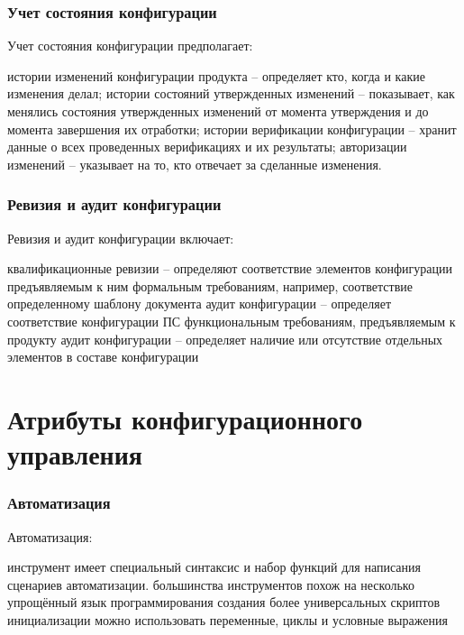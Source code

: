 \documentclass{../industrial-development}
\begin{document}
\lecturenotes

\begin{frame} \frametitle{Учет состояния конфигурации}
  \begin{block}{Учет состояния конфигурации предполагает:}
  \begin{itemize}
 истории изменений конфигурации продукта – определяет кто, когда и какие изменения делал;
 истории состояний утвержденных изменений – показывает, как менялись состояния утвержденных изменений от момента утверждения и до момента завершения их отработки;
 истории верификации конфигурации – хранит данные о всех проведенных верификациях и их результаты;
 авторизации изменений – указывает на то, кто отвечает за сделанные изменения.
  \end{itemize}
	\end{block}
\end{frame}

\lecturenotes

\begin{frame} \frametitle{Ревизия и аудит конфигурации}
  \begin{block}{Ревизия и аудит конфигурации включает:}
  \begin{itemize}
 квалификационные ревизии – определяют соответствие элементов конфигурации предъявляемым к ним формальным требованиям, например, соответствие определенному шаблону документа
 аудит конфигурации – определяет соответствие конфигурации ПС функциональным требованиям, предъявляемым к продукту
 аудит конфигурации – определяет наличие или отсутствие отдельных элементов в составе конфигурации

  \end{itemize}
	\end{block}
\end{frame}

\section{Атрибуты конфигурационного управления}

\begin{frame} \frametitle{Автоматизация}
  \begin{block}{Автоматизация:}
  \begin{itemize}
 инструмент имеет специальный синтаксис и набор функций для написания сценариев автоматизации. 
 большинства инструментов похож на несколько упрощённый язык программирования
 создания более универсальных скриптов инициализации можно использовать переменные, циклы и условные выражения

  \end{itemize}
	\end{block}
\end{frame}
\end{document}
